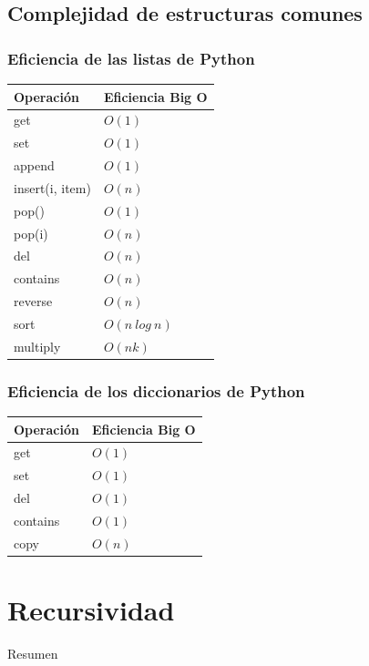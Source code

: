 \documentclass[11pt]{beamer}
\begin{document}
	\subsection{Complejidad de estructuras comunes}

	\begin{frame}\frametitle{Eficiencia de las listas de Python}
	\begin{center}
	\begin{tabular}{l|l}
	\hline
	\textbf{Operación} &\textbf{ Eficiencia Big O} \\
	\hline
	get & $O(1)$ \\
	set & $O(1)$ \\
	append & $O(1)$ \\
	insert(i, item) & $O(n)$ \\
	pop() & $O(1)$ \\
	pop(i) & $O(n)$ \\
	del & $O(n)$ \\
	contains & $O(n)$ \\
	reverse & $O(n)$ \\
	sort & $O(n\ log\ n)$ \\
	multiply & $O(nk)$ \\
	\end{tabular}
	\end{center}
	\end{frame}


	\begin{frame}\frametitle{Eficiencia de los diccionarios de Python}
	\begin{center}
	\begin{tabular}{l|l}
	\hline
	\textbf{Operación} &\textbf{ Eficiencia Big O} \\
	\hline
	get & $O(1)$ \\
	set & $O(1)$ \\
	del & $O(1)$ \\
	contains & $O(1)$ \\
	copy & $O(n)$ \\
	\end{tabular}
	\end{center}
	\end{frame}

	\section{Recursividad}

	\begin{frame}{Resumen}
	\end{frame}
\end{document}
